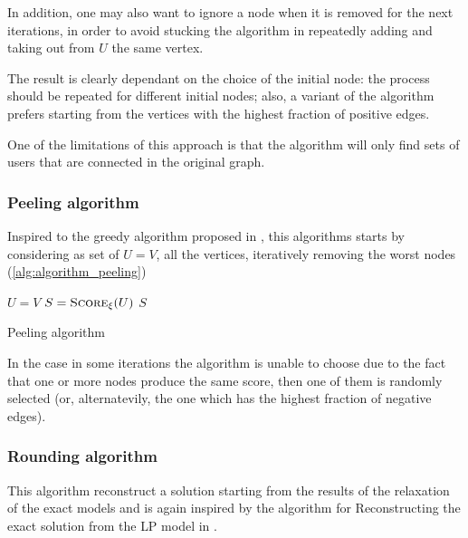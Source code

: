 In addition, one may also want to ignore a node when it is removed for the
next iterations, in order to avoid stucking the algorithm in repeatedly adding
and taking out from $U$ the same vertex.

The result is clearly dependant on the choice of the initial node: the process
should be repeated for different initial nodes; also, a variant
of the algorithm prefers starting from the vertices with the highest fraction of positive edges.

One of the limitations of this approach is that the algorithm will only find
sets of users that are connected in the original graph.

\subsubsection{Peeling algorithm}%
\label{ssub:peeling_algorithm}

Inspired to the greedy algorithm proposed in \cite{charikar2000greedy}, this
algorithms starts by considering as set of $U = V$, all the vertices,
iteratively removing the worst nodes (\autoref{alg:algorithm_peeling})

\begin{algorithm}
	\SetAlgoLined
	$U = V$\;
	$S = \textsc{Score}_{\xi}(U)$ \;
	\Return $S$ \;

	\caption{Peeling algorithm}
	\label{alg:algorithm_peeling}
\end{algorithm}

In the case in some iterations the algorithm is unable to choose due to the
fact that one or more nodes produce the same score, then one of them is
randomly selected (or, alternatevily, the one which has the highest fraction of
negative edges).

\subsubsection{Rounding algorithm}%
\label{ssub:rounding_algorithm}

This algorithm reconstruct a solution starting from the results of the
relaxation of the exact models and is again inspired by the algorithm for
Reconstructing the exact solution from the \acrshort{LP} model in
\cite{charikar2000greedy}.

